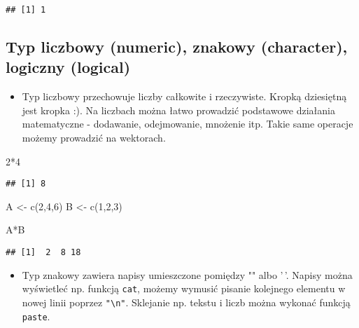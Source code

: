 \documentclass[
]{book}
\newenvironment{Shaded}{\begin{snugshade}}{\end{snugshade}}
\newcommand{\DecValTok}[1]{\textcolor[rgb]{0.00,0.00,0.81}{#1}}
\newcommand{\FunctionTok}[1]{\textcolor[rgb]{0.00,0.00,0.00}{#1}}
\newcommand{\NormalTok}[1]{#1}
\newcommand{\OtherTok}[1]{\textcolor[rgb]{0.56,0.35,0.01}{#1}}
\newcommand{\SpecialCharTok}[1]{\textcolor[rgb]{0.00,0.00,0.00}{#1}}
\providecommand{\tightlist}{%
  \setlength{\itemsep}{0pt}\setlength{\parskip}{0pt}}
\begin{document}
\begin{verbatim}
## [1] 1
\end{verbatim}

\hypertarget{typ-liczbowy-numeric-znakowy-character-logiczny-logical}{%
\subsection{Typ liczbowy (numeric), znakowy (character), logiczny (logical)}\label{typ-liczbowy-numeric-znakowy-character-logiczny-logical}}

\begin{itemize}
\tightlist
\item
  Typ liczbowy przechowuje liczby całkowite i rzeczywiste. Kropką dziesiętną jest kropka :). Na liczbach można łatwo prowadzić podstawowe działania matematyczne - dodawanie, odejmowanie, mnożenie itp. Takie same operacje możemy prowadzić na wektorach.
\end{itemize}

\begin{Shaded}
\begin{Highlighting}[]
\DecValTok{2}\SpecialCharTok{*}\DecValTok{4}
\end{Highlighting}
\end{Shaded}

\begin{verbatim}
## [1] 8
\end{verbatim}

\begin{Shaded}
\begin{Highlighting}[]
\NormalTok{A }\OtherTok{\textless{}{-}} \FunctionTok{c}\NormalTok{(}\DecValTok{2}\NormalTok{,}\DecValTok{4}\NormalTok{,}\DecValTok{6}\NormalTok{)}
\NormalTok{B }\OtherTok{\textless{}{-}} \FunctionTok{c}\NormalTok{(}\DecValTok{1}\NormalTok{,}\DecValTok{2}\NormalTok{,}\DecValTok{3}\NormalTok{)}

\NormalTok{A}\SpecialCharTok{*}\NormalTok{B}
\end{Highlighting}
\end{Shaded}

\begin{verbatim}
## [1]  2  8 18
\end{verbatim}

\begin{itemize}
\tightlist
\item
  Typ znakowy zawiera napisy umieszczone pomiędzy "" albo '\,'. Napisy można wyświetleć np. funkcją \texttt{cat}, możemy wymusić pisanie kolejnego elementu w nowej linii poprzez \texttt{"\textbackslash{}n"}. Sklejanie np. tekstu i liczb można wykonać funkcją \texttt{paste}.
\end{itemize}
\end{document}
